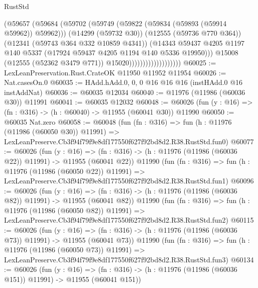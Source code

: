 \begin{lexlean}{RustStd}
\begin{coremodule}
                                      (@59657
                                        (@59684
                                          (@59702
                                            (@59749
                                              (@59822 (@59834 (@59893 (@59914 @59962)) @59962)))
                                            (@14299 (@59732 @30))
                                            (@12555 (@59736 @770 @364))
                                            (@12341 (@59743 @364 @332 @10859 @4341))
                                            (@14343
                                              @59437
                                              @4205
                                              @1197
                                              @140
                                              @5337
                                              (@17924 @59437 @4205 @1194 @140 @5336 @19950)))
                                          @15008
                                          (@12555 (@52362 @3479 @771))
                                          @15020)))))))))))))))))))
@60025 := LexLeanPreservation.Rust.CrateOK @11950 @11952 @11954
@60026 := Nat.casesOn.{0}
@60035 := HAdd.hAdd.{0, 0, 0} @16 @16 @16 (instHAdd.{0} @16 instAddNat)
@60036 := @60035 @12034
@60040 := @11976 (@11986 (@60036 @30)) @11991
@60041 := @60035 @12032
@60048 := @60026 (fun (y : @16) => (fn : @316) -> (h : @60040) -> @11955 (@60041 @30)) @11990
@60050 := @60035 Nat.zero
@60058 := @60048
    (fun (fn : @316) =>
    fun (h : @11976 (@11986 (@60050 @30)) @11991) =>
    LexLeanPreserve.Cb3f94f79f9e8df177550f627f92bd8d2.R38.RustStd.fun0)
@60077 := @60026
    (fun (y : @16) =>
    (fn : @316) -> (h : @11976 (@11986 (@60036 @22)) @11991) -> @11955 (@60041 @22))
    @11990
    (fun (fn : @316) =>
    fun (h : @11976 (@11986 (@60050 @22)) @11991) =>
    LexLeanPreserve.Cb3f94f79f9e8df177550f627f92bd8d2.R38.RustStd.fun1)
@60096 := @60026
    (fun (y : @16) =>
    (fn : @316) -> (h : @11976 (@11986 (@60036 @82)) @11991) -> @11955 (@60041 @82))
    @11990
    (fun (fn : @316) =>
    fun (h : @11976 (@11986 (@60050 @82)) @11991) =>
    LexLeanPreserve.Cb3f94f79f9e8df177550f627f92bd8d2.R38.RustStd.fun2)
@60115 := @60026
    (fun (y : @16) =>
    (fn : @316) -> (h : @11976 (@11986 (@60036 @73)) @11991) -> @11955 (@60041 @73))
    @11990
    (fun (fn : @316) =>
    fun (h : @11976 (@11986 (@60050 @73)) @11991) =>
    LexLeanPreserve.Cb3f94f79f9e8df177550f627f92bd8d2.R38.RustStd.fun3)
@60134 := @60026
    (fun (y : @16) =>
    (fn : @316) -> (h : @11976 (@11986 (@60036 @151)) @11991) -> @11955 (@60041 @151))

\end{coremodule}
\end{lexlean}
